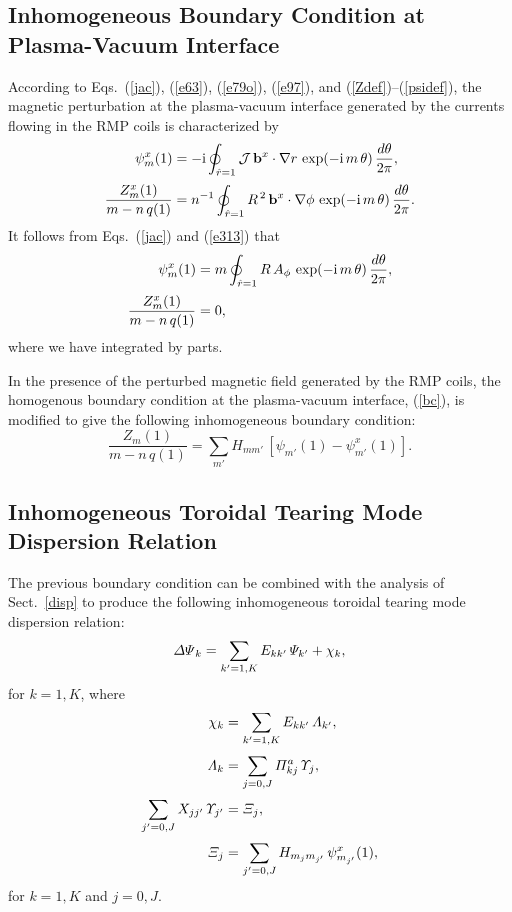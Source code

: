 \documentclass[12pt,prb,aps]{revtex4-1}
\begin{document}
\subsection{Inhomogeneous Boundary Condition at Plasma-Vacuum Interface}
According to Eqs.~(\ref{jac}), (\ref{e63}), (\ref{e79o}), (\ref{e97}), and (\ref{Zdef})--(\ref{psidef}), the magnetic perturbation at the plasma-vacuum
interface generated by the currents flowing in the RMP coils is characterized by
\begin{align}
\psi_m^x(1) &=-{\rm i}\oint_{\hat{r}=1}{\cal J}\,{\bf b}^x\cdot\nabla r\,\exp(-{\rm i}\,m\,\theta)\,\frac{d\theta}{2\pi},\\[0.5ex]
\frac{Z_m^x(1)}{m-n\,q(1)}  &= n^{-1}\oint_{\hat{r}=1}R^{\,2}\,{\bf b}^x\cdot\nabla \phi\,\exp(-{\rm i}\,m\,\theta)\,\frac{d\theta}{2\pi}.
\end{align}
It follows from Eqs.~(\ref{jac}) and (\ref{e313}) that
\begin{align}
\psi_m^x(1) &= m \oint_{\hat{r}=1}R\,A_\phi\,\exp(-{\rm i}\,m\,\theta)\,\frac{d\theta}{2\pi},\\[0.5ex]
\frac{Z_m^x(1)}{m-n\,q(1)}  &= 0,
\end{align}
where we have integrated by parts. 

In the presence of the perturbed magnetic field generated by the RMP coils, the homogenous boundary condition at the plasma-vacuum
interface, (\ref{bc}), is modified to give the following inhomogeneous boundary condition:
\begin{equation}\label{bc1}
\frac{Z_m(1)}{m-n\,q(1)} = \sum_{m'} H_{mm'}\,[\psi_{m'}(1)-\psi_{m'}^x(1)].
\end{equation}

\subsection{Inhomogeneous Toroidal Tearing Mode Dispersion Relation}
The previous boundary condition can be combined with the analysis of Sect.~\ref{disp} to produce the following
inhomogeneous toroidal tearing mode dispersion relation:\,\cite{am3,nelson}
\begin{equation}\label{disp1}
{\mit\Delta\Psi}_k = \sum_{k'=1,K} E_{kk'}\,{\mit\Psi}_{k'} + \chi_k,
\end{equation}
for $k=1,K$, where 
\begin{align}
\chi_k &= \sum_{k'=1,K}E_{kk'}\,{\mit \Lambda}_{k'},\\[0.5ex]
{\mit\Lambda}_{k} &= \sum_{j=0,J} {\mit\Pi}_{kj}^a\,{\mit\Upsilon}_{j},\\[0.5ex]
\sum_{j'=0,J} X_{jj'}\,{\mit\Upsilon}_{j'} &= {\mit\Xi}_{j},\\[0.5ex]
{\mit\Xi}_{j} &= \sum_{j'=0,J} H_{m_j m_{j'}}\,\psi_{m_{j'}}^x(1),
\end{align}
for $k=1,K$ and $j=0,J$. 
\end{document}
